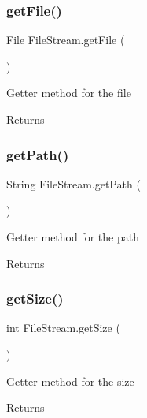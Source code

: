 \subsubsection{\texorpdfstring{get\+File()}{getFile()}}
{\footnotesize\ttfamily File File\+Stream.\+get\+File (\begin{DoxyParamCaption}{ }\end{DoxyParamCaption})\hspace{0.3cm}{\ttfamily [inline]}}

Getter method for the file \begin{DoxyReturn}{Returns}

\end{DoxyReturn}
\mbox{\label{class_file_stream_ab5040ef2d7c336c123902ab493001866}} 
\subsubsection{\texorpdfstring{get\+Path()}{getPath()}}
{\footnotesize\ttfamily String File\+Stream.\+get\+Path (\begin{DoxyParamCaption}{ }\end{DoxyParamCaption})\hspace{0.3cm}{\ttfamily [inline]}}

Getter method for the path \begin{DoxyReturn}{Returns}

\end{DoxyReturn}
\mbox{\label{class_file_stream_ab8f4d0c94a6c1357c7af77a4121e52fc}} 
\subsubsection{\texorpdfstring{get\+Size()}{getSize()}}
{\footnotesize\ttfamily int File\+Stream.\+get\+Size (\begin{DoxyParamCaption}{ }\end{DoxyParamCaption})\hspace{0.3cm}{\ttfamily [inline]}}

Getter method for the size \begin{DoxyReturn}{Returns}

\end{DoxyReturn}
\mbox{\label{class_file_stream_a7f2ea40eff2241931a4ca971364cd532}} 
